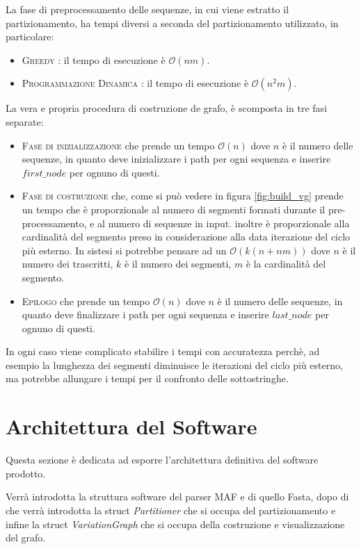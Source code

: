 La fase di preprocessamento delle sequenze, in cui viene estratto il partizionamento, ha tempi diversi a seconda del partizionamento utilizzato, in particolare:

\begin{itemize}
    \item \textsc{Greedy} : il tempo di esecuzione è $\mathcal{O}(nm)$.
    \item \textsc{Programmazione Dinamica} : il tempo di esecuzione è $\mathcal{O}(n^2m)$.
\end{itemize}

La vera e propria procedura di costruzione de grafo, è scomposta in tre fasi separate:

\begin{itemize}
    \item \textsc{Fase di inizializzazione} che prende un tempo $\mathcal{O}(n)$ dove $n$ è il numero delle sequenze, in quanto deve inizializzare i path per ogni sequenza e inserire $first\_node$ per ognuno di questi.
    \item \textsc{Fase di costruzione} che, come si può vedere in figura \ref{fig:build_vg} prende un tempo che è proporzionale al numero di segmenti formati durante il pre-processamento, e al numero di sequenze in input. inoltre è proporzionale alla cardinalità del segmento preso in considerazione alla data iterazione del ciclo più esterno.
    In sistesi si potrebbe pensare ad un $\mathcal{O}(k(n + nm))$ dove $n$ è il numero dei trascritti, $k$ è il numero dei segmenti, $m$ è la cardinalità del segmento.
    \item \textsc{Epilogo} che prende un tempo $\mathcal{O}(n)$ dove $n$ è il numero delle sequenze, in quanto deve finalizzare i path per ogni sequenza e inserire $last\_node$ per ognuno di questi.
\end{itemize}

In ogni caso viene complicato stabilire i tempi con accuratezza perchè, ad esempio la lunghezza dei segmenti diminuisce le iterazioni del ciclo più esterno, ma potrebbe allungare i tempi per il confronto delle sottostringhe.

\newpage

\section{Architettura del Software}
Questa sezione è dedicata ad esporre l'architettura definitiva del software prodotto.

Verrà introdotta la struttura software del parser MAF e di quello Fasta, dopo di che verrà introdotta la struct \textit{Partitioner} che si occupa del partizionamento e infine la struct \textit{VariationGraph} che si occupa della costruzione e visualizzazione del grafo.

